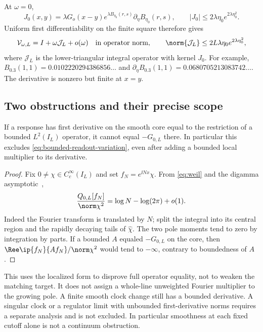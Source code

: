 At $\omega=0$,
\begin{equation}
 J_0(x,y)=\lambda G_o(x-y)e^{\lambda B_{\eta_0}(r,s)}
                         \partial_\eta B_{\eta_0}(r,s),
 \qquad
 |J_0|\le2\lambda\eta_0e^{2\lambda\eta_0^2}.
\end{equation}
Uniform first differentiability on the finite square therefore gives
\begin{equation}\label{eq:bounded-readout-variation}
 \mathcal V_{\omega,L}=I+\omega\mathcal J_L+o(\omega)
 \quad\hbox{in operator norm},\qquad
 \norm{\mathcal J_L}\le2L\lambda\eta_0e^{2\lambda\eta_0^2},
\end{equation}
where $\mathcal J_L$ is the lower-triangular integral
operator with kernel $J_0$.
For example,
$B_{0.3}(1,1)=0.0102220294386856\ldots$ and
$\partial_\eta B_{0.3}(1,1)=0.0680705213083742\ldots$.
The derivative is nonzero but finite at $x=y$.

\subsection{Two obstructions and their precise scope}
\label{subsec:readout-obstructions}

\begin{proposition}
\label{prop:bounded-response}
If a response has first derivative on the smooth core equal
to the restriction of a bounded $L^2(I_L)$ operator, it cannot
equal $-G_{0,L}$ there. In particular this excludes
\eqref{eq:bounded-readout-variation}, even after adding a
bounded local multiplier to its derivative.
\end{proposition}
\begin{proof}
Fix $0\ne\chi\in C_c^\infty(I_L)$ and set
$f_N=e^{\ii Nx}\chi$. From \eqref{eq:weil} and the digamma
asymptotic~\cite[Section~5.11]{DLMFGamma},
\begin{equation}\label{eq:modulation-growth}
 \frac{Q_{0,L}[f_N]}{\norm\chi^2}
 =\log N-\log(2\pi)+o(1).
\end{equation}
Indeed the Fourier transform is translated by $N$; split the
integral into its central region and the rapidly decaying
tails of $\widehat\chi$. The two pole moments tend to zero
by integration by parts. If a bounded $A$ equaled $-G_{0,L}$
on the core, then
$\Ree\ip{f_N}{Af_N}/\norm\chi^2$ would tend to $-\infty$,
contrary to boundedness of $A$.
\end{proof}

This uses the localized form to disprove full operator
equality, not to weaken the matching target. It does not
assign a whole-line unweighted Fourier multiplier to the
growing pole. A finite smooth clock change still has a
bounded derivative. A singular clock or a regulator limit
with unbounded first-derivative norms requires a separate
analysis and is not excluded. In particular smoothness at
each fixed cutoff alone is not a continuum obstruction.

